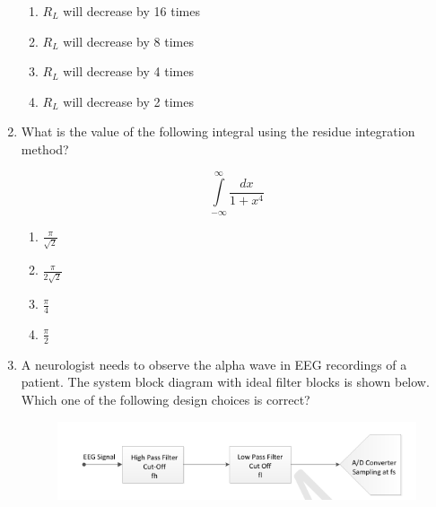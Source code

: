 \documentclass[a4paper,12pt]{exam}
\numberwithin{equation}{enumi}
\numberwithin{figure}{enumi}
\begin{document}
\begin{enumerate}
\hfill{}

\begin{enumerate}
\item $R_L$  will decrease by 16 times
\item $R_L$  will decrease by 8 times
\item $R_L$  will decrease by 4 times
\item $R_L$  will decrease by 2 times
\end{enumerate}  

\item What is the value of the following integral using the residue integration method?

\begin{equation*}
\displaystyle\int\limits_{-\infty}^\infty\frac{dx}{1 + x^4}
\end{equation*}

\hfill{}

\begin{multicols}{4}
\begin{enumerate}
\item $\frac{\pi}{\sqrt{2}}$
\vspace{0.25cm}
\item $\frac{\pi}{2\sqrt{2}}$
\vspace{0.25cm}
\item $\frac{\pi}{4}$
\vspace{0.25cm}
\item $\frac{\pi}{2}$
\vspace{0.25cm}
\end{enumerate} 
\end{multicols}

\item A neurologist needs to observe the alpha wave in EEG recordings of a patient. The  system block diagram with ideal filter blocks is shown below. Which one of the following design choices is correct?

\begin{figure}[H]
\centering
\includegraphics[width=0.8\columnwidth]{figs/Q45.png}
\label{fig:Q45.png}
\end{figure}

\hfill{}


\end{enumerate}
\end{document}
